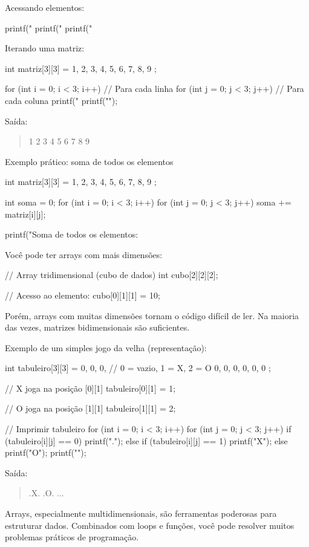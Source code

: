 Acessando elementos:

\begin{ccode}
  printf("%
  printf("%
  printf("%
\end{ccode}

Iterando uma matriz:

\begin{ccode}
  int matriz[3][3] = {
    {1, 2, 3},
    {4, 5, 6},
    {7, 8, 9}
  };

  for (int i = 0; i < 3; i++) {           // Para cada linha
    for (int j = 0; j < 3; j++) {         // Para cada coluna
      printf("%
    }
    printf("\n");
  }
\end{ccode}

Saída:
\begin{quote}
  1 2 3
  4 5 6
  7 8 9
\end{quote}

Exemplo prático: soma de todos os elementos

\begin{ccode}
  int matriz[3][3] = {
    {1, 2, 3},
    {4, 5, 6},
    {7, 8, 9}
  };

  int soma = 0;
  for (int i = 0; i < 3; i++) {
    for (int j = 0; j < 3; j++) {
      soma += matriz[i][j];
    }
  }

  printf("Soma de todos os elementos: %
\end{ccode}

Você pode ter arrays com mais dimensões:

\begin{ccode}
  // Array tridimensional (cubo de dados)
  int cubo[2][2][2];

  // Acesso ao elemento:
  cubo[0][1][1] = 10;
\end{ccode}

Porém, arrays com muitas dimensões tornam o código difícil de ler. Na maioria das vezes, matrizes bidimensionais são suficientes.

Exemplo de um simples jogo da velha (representação):

\begin{ccode}
  int tabuleiro[3][3] = {
    {0, 0, 0},    // 0 = vazio, 1 = X, 2 = O
    {0, 0, 0},
    {0, 0, 0}
  };

  // X joga na posição [0][1]
  tabuleiro[0][1] = 1;

  // O joga na posição [1][1]
  tabuleiro[1][1] = 2;

  // Imprimir tabuleiro
  for (int i = 0; i < 3; i++) {
    for (int j = 0; j < 3; j++) {
      if (tabuleiro[i][j] == 0) {
        printf(".");
      } else if (tabuleiro[i][j] == 1) {
        printf("X");
      } else {
        printf("O");
      }
    }
    printf("\n");
  }
\end{ccode}

Saída:
\begin{quote}
  .X.
  .O.
  ...
\end{quote}

Arrays, especialmente multidimensionais, são ferramentas poderosas para estruturar dados. Combinados com loops e funções, você pode resolver muitos problemas práticos de programação.

